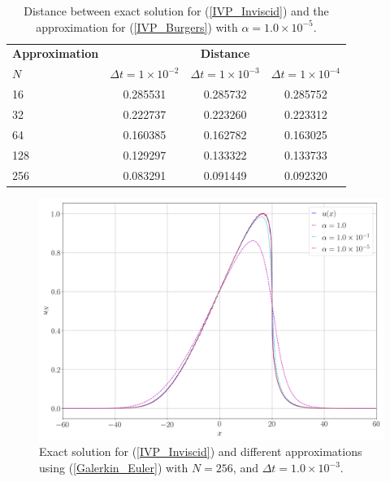 	\newpage
	\begin{table}[H]
		\centering
		\begin{tabular}{lccc}
			\toprule
			\multicolumn{1}{c}{\textbf{Approximation}} & \multicolumn{3}{c}{\textbf{Distance}} \\
			\hspace{12mm} $N$ & $\Delta t=1\times 10^{-2}$ & $\Delta t=1\times 10^{-3}$ & $\Delta t=1\times 10^{-4}$ \\
			\midrule
			\hspace{12mm} 16 & 0.285531 & 0.285732 & 0.285752 \\
			\midrule
			\hspace{12mm} 32 & 0.222737 & 0.223260 & 0.223312 \\
			\midrule
			\hspace{12mm} 64 & 0.160385 & 0.162782 & 0.163025 \\
			\midrule
			\hspace{12mm} 128 & 0.129297 & 0.133322 & 0.133733 \\
			\midrule
			\hspace{12mm} 256 & 0.083291 & 0.091449 & 0.092320 \\
			\bottomrule
		\end{tabular}
		\caption{Distance between exact solution for (\ref{IVP_Inviscid}) and the approximation for (\ref{IVP_Burgers}) with $\alpha = 1.0 \times 10^{-5}$.}
	\end{table}
	\begin{figure}[H]
		\centering
		\includegraphics[width=12cm]{burgers_equation/deterministic/numerical_experiments/inviscid/figures/varios_alphas.png}
		\caption{Exact solution for (\ref{IVP_Inviscid}) and different approximations using (\ref{Galerkin_Euler}) with $N=256$, and $\Delta t = 1.0 \times 10^{-3}$.}
	\end{figure}